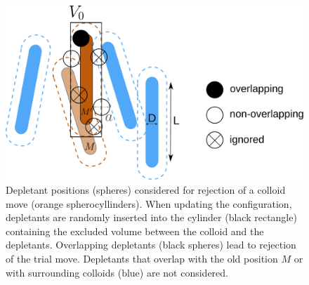 \begin{figure}
\begin{center}
\includegraphics[width= .8\columnwidth]{figures/chapter-1/implicit_depletants}
\caption[Depletant positions (spheres) considered for rejection of a colloid move (orange spherocyllinders)]{ \label{implicit} Depletant positions (spheres) considered for rejection of a colloid move (orange spherocyllinders). When updating the configuration, depletants are randomly inserted into the cylinder (black rectangle) containing the excluded volume between the colloid and the depletants. Overlapping depletants (black spheres) lead to rejection of the trial move. Depletants that overlap with the old position $M$ or with surrounding colloids (blue) are not considered.}
\end{center}
\end{figure}

\clearpage